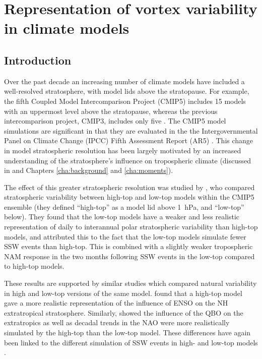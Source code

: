 \chapter{Representation of vortex variability in climate models}
\label{cha:models}


\section{Introduction}
\label{sec:models_introduction}

Over the past decade an increasing number of climate models have included a
well-resolved stratosphere, with model lids above the stratopause. For example,
the fifth Coupled Model Intercomparison Project (CMIP5) \citep{Taylor2012}
includes 15 models with an uppermost level above the stratopause, whereas the
previous intercomparison project, CMIP3, includes only five
\citep{Cordero2006}. The CMIP5 model simulations are significant in that they
are evaluated in the the Intergovernmental Panel on Climate Change (IPCC) Fifth
Assessment Report (AR5) \citep{Stocker2013}. This change in model stratospheric
resolution has been largely motivated by an increased understanding of the
stratosphere's influence on tropospheric climate (discussed in
\citet{Gerber2012} and Chapters \ref{cha:background} and \ref{cha:moments}).

The effect of this greater stratospheric resolution was studied by
\citet{Charlton-Perez2013}, who compared stratospheric variability between
high-top and low-top models within the CMIP5 ensemble (they defined ``high-top''
as a model lid above 1~hPa, and ``low-top'' below). They found that the low-top
models have a weaker and less realistic representation of daily to interannual
polar stratospheric variability than high-top models, and attributed this to the
fact that the low-top models simulate fewer SSW events than high-top. This is
combined with a slightly weaker tropospheric NAM response in the two months
following SSW events in the low-top compared to high-top models.

These results are supported by similar studies which compared natural
variability in high and low-top versions of the same model. \citet{Cagnazzo2009}
found that a high-top model gave a more realistic representation of the
influence of ENSO on the NH extratropical stratosphere. Similarly,
\citet{Hardiman2012a} showed the influence of the QBO on the extratropics as
well as decadal trends in the NAO were more realistically simulated by the
high-top than the low-top model. These differences have again been linked to the
different simulation of SSW events in high- and low-top models
\citep{Sassi2010}.

